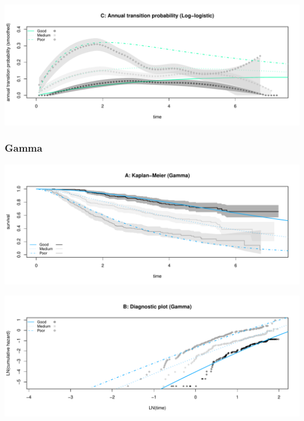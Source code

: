 \documentclass[
]{article}
\begin{document}
\begin{flushleft}\includegraphics[height=0.25\textheight]{BC_OS_output/Images/Figure_param_models-15} \end{flushleft}

\clearpage

\subsubsection{Gamma}\label{gamma}

\begin{flushleft}\includegraphics[height=0.25\textheight]{BC_OS_output/Images/Figure_param_models-16} \end{flushleft}

\begin{flushleft}\includegraphics[height=0.25\textheight]{BC_OS_output/Images/Figure_param_models-17} \end{flushleft}
\end{document}
